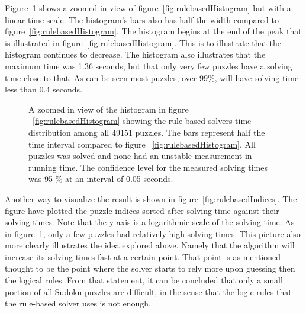 \documentclass[a4paper,11pt]{kth-mag}
\begin{document}
Figure~\ref{fig:rulebasedHistogram2} shows a zoomed in view of figure~\ref{fig:rulebasedHistogram} but with a linear time scale.
The histogram's bars also has half the width compared to figure~\ref{fig:rulebasedHistogram}.
The histogram begins at the end of the peak that is illustrated in figure~\ref{fig:rulebasedHistogram}.
This is to illustrate that the histogram continues to decrease.
The histogram also illustrates that the maximum time was 1.36 seconds, but that only very few puzzles have a solving time close to that.
As can be seen most puzzles, over $99\%$, will have solving time less than 0.4 seconds.

\begin{figure}[here] 
\noindent{}
\vspace{-40pt}
\caption[Histogram with solving times for rule-based in a zoomed in view]{A zoomed in view of the histogram in figure ~\ref{fig:rulebasedHistogram} showing the rule-based solvers time distribution among all 49151 puzzles. The bars represent half the time interval compared to figure ~\ref{fig:rulebasedHistogram}. All puzzles was solved and none had an unstable measurement in running time. The confidence level for the measured solving times was 95 \% at an interval of 0.05 seconds.}
\label{fig:rulebasedHistogram2}
\end{figure}

\FloatBarrier
Another way to visualize the result is shown in figure~\ref{fig:rulebasedIndices}.
The figure have plotted the puzzle indices sorted after solving time against their solving times.
Note that the y-axis is a logarithmic scale of the solving time.
As in figure~\ref{fig:rulebasedHistogram2}, only a few puzzles had relatively high solving times.
This picture also more clearly illustrates the idea explored above.
Namely that the algorithm will increase its solving times fast at a certain point.
That point is as mentioned thought to be the point where the solver starts to rely more upon guessing then the logical rules.
From that statement, it can be concluded that only a small portion of all Sudoku puzzles are difficult, in the sense that the logic rules that the rule-based solver uses is not enough.
\end{document}
